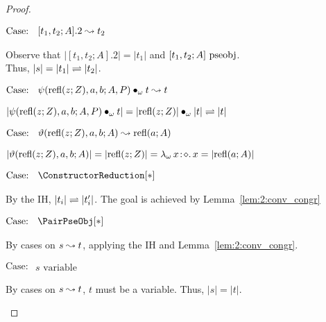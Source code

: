 \begin{proof}
\begin{proofcase}
        $\text{Case: }\begin{array}{c} [t_1, t_2; A].2 \leadsto t_2 \end{array}$
        \begin{proofcase}
            Observe that $|[t_1, t_2; A].2| = |t_1|$ and $[t_1, t_2; A]~\textnormal{pseobj}$. \\
            Thus, $|s| = |t_1| \rightleftharpoons |t_2|$.
        \end{proofcase}

        $\text{Case: }\begin{array}{c} \psi(\text{refl}(z; Z), a, b; A, P) \bullet_{\omega} t \leadsto t \end{array}$
        \begin{proofcase}
            $|\psi(\text{refl}(z; Z), a, b; A, P) \bullet_{\omega} t| = |\text{refl}(z;Z)| \bullet_{\omega} |t| \rightleftharpoons |t|$
        \end{proofcase}

        $\text{Case: }\begin{array}{c} \vartheta(\text{refl}(z; Z), a, b; A) \leadsto \text{refl}(a; A) \end{array}$
        \begin{proofcase}
            $|\vartheta(\text{refl}(z; Z), a, b; A)| = |\text{refl}(z; Z)| = {\lambda_\omega}\, x\! : \! \diamond.\, x = |\text{refl}(a; A)|$
        \end{proofcase}

        $\text{Case: }\begin{array}{c} \ConstructorReduction[*] \end{array}$
        \begin{proofcase}
            By the IH, $|t_i| \rightleftharpoons |t_i^\prime|$. The goal is achieved by Lemma~\ref{lem:2:conv_congr}
        \end{proofcase}

    \end{proofcase}

    $\text{Case: }\begin{array}{c} \PairPseObj[*] \end{array}$
    \begin{proofcase}
        By cases on $s \leadsto t$, applying the IH and Lemma~\ref{lem:2:conv_congr}.
    \end{proofcase}

    $\text{Case: }\begin{array}{c} s\text{ variable} \end{array}$
    \begin{proofcase}
        By cases on $s \leadsto t$, $t$ must be a variable.
        Thus, $|s| = |t|$.
    \end{proofcase}
\end{proof}


